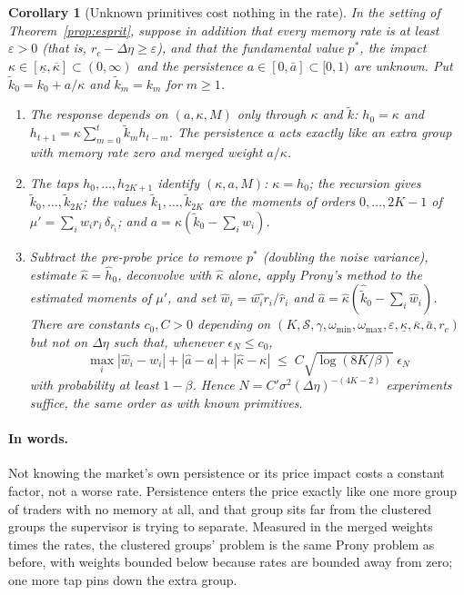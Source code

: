\documentclass[12pt]{article}
\newtheorem{corollary}[theorem]{Corollary}
\theoremstyle{definition}
\theoremstyle{remark}
\begin{document}
\begin{corollary}[Unknown primitives cost nothing in the rate]
\label{cor:unknown_primitives}
In the setting of Theorem~\ref{prop:esprit}, suppose in addition that every memory rate is at least $\varepsilon>0$ (that is, $r_c-\Delta\eta\ge\varepsilon$), and that the fundamental value $p^*$, the impact $\kappa\in[\underline\kappa,\overline\kappa]\subset(0,\infty)$ and the persistence $a\in[0,\bar a]\subset[0,1)$ are unknown. Put $\tilde k_0=k_0+a/\kappa$ and $\tilde k_m=k_m$ for $m\ge1$.
\begin{enumerate}[label=(\roman*)]
\item The response depends on $(a,\kappa,M)$ only through $\kappa$ and $\tilde k$: $h_0=\kappa$ and $h_{t+1}=\kappa\sum_{m=0}^{t}\tilde k_mh_{t-m}$. The persistence $a$ acts exactly like an extra group with memory rate zero and merged weight $a/\kappa$.
\item The taps $h_0,\ldots,h_{2K+1}$ identify $(\kappa,a,M)$: $\kappa=h_0$; the recursion gives $\tilde k_0,\ldots,\tilde k_{2K}$; the values $\tilde k_1,\ldots,\tilde k_{2K}$ are the moments of orders $0,\ldots,2K-1$ of $\mu'=\sum_iw_ir_i\,\delta_{r_i}$; and $a=\kappa(\tilde k_0-\sum_iw_i)$.
\item Subtract the pre-probe price to remove $p^*$ (doubling the noise variance), estimate $\hat\kappa=\hat h_0$, deconvolve with $\hat\kappa$ alone, apply Prony's method to the estimated moments of $\mu'$, and set $\hat w_i=\widehat{w_ir_i}/\hat r_i$ and $\hat a=\hat\kappa(\hat{\tilde k}_0-\sum_i\hat w_i)$. There are constants $c_0,C>0$ depending on $(K,\mathcal S,\gamma,\omega_{\min},\omega_{\max},\varepsilon,\underline\kappa,\overline\kappa,\bar a,r_c)$ but not on $\Delta\eta$ such that, whenever $\epsilon_N\le c_0$,
\[
\max_i|\hat w_i-w_i|+|\hat a-a|+|\hat\kappa-\kappa|\;\le\;C\sqrt{\log(8K/\beta)}\;\epsilon_N
\]
with probability at least $1-\beta$. Hence $N=C'\sigma^2(\Delta\eta)^{-(4K-2)}$ experiments suffice, the same order as with known primitives.
\end{enumerate}
\end{corollary}

\paragraph{In words.} Not knowing the market's own persistence or its price impact costs a constant factor, not a worse rate. Persistence enters the price exactly like one more group of traders with no memory at all, and that group sits far from the clustered groups the supervisor is trying to separate. Measured in the merged weights times the rates, the clustered groups' problem is the same Prony problem as before, with weights bounded below because rates are bounded away from zero; one more tap pins down the extra group.
\end{document}
